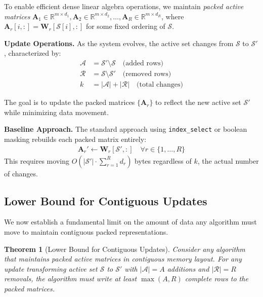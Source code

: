 \documentclass{article}
\numberwithin{equation}{section}
\theoremstyle{plain}
\newtheorem{theorem}{Theorem}[section]
\theoremstyle{definition}
\theoremstyle{remark}
\begin{document}
To enable efficient dense linear algebra operations, we maintain \emph{packed active matrices} $\mathbf{A}_1 \in \mathbb{R}^{m \times d_1}, \mathbf{A}_2 \in \mathbb{R}^{m \times d_2}, \ldots, \mathbf{A}_R \in \mathbb{R}^{m \times d_R}$, where $\mathbf{A}_r[i, :] = \mathbf{W}_r[\mathcal{S}[i], :]$ for some fixed ordering of $\mathcal{S}$.

\textbf{Update Operations.} As the system evolves, the active set changes from $\mathcal{S}$ to $\mathcal{S}'$, characterized by:
\begin{align}
\mathcal{A} &= \mathcal{S}' \setminus \mathcal{S} \quad \text{(added rows)} \\
\mathcal{R} &= \mathcal{S} \setminus \mathcal{S}' \quad \text{(removed rows)} \\
k &= |\mathcal{A}| + |\mathcal{R}| \quad \text{(total changes)}
\end{align}

The goal is to update the packed matrices $\{\mathbf{A}_r\}$ to reflect the new active set $\mathcal{S}'$ while minimizing data movement.

\textbf{Baseline Approach.} The standard approach using \texttt{index\_select} or boolean masking rebuilds each packed matrix entirely:
\begin{align}
\mathbf{A}_r' \leftarrow \mathbf{W}_r[\mathcal{S}', :] \quad \forall r \in \{1, \ldots, R\}
\end{align}
This requires moving $O(|\mathcal{S}'| \cdot \sum_{r=1}^R d_r)$ bytes regardless of $k$, the actual number of changes.

\subsection{Lower Bound for Contiguous Updates}

We now establish a fundamental limit on the amount of data any algorithm must move to maintain contiguous packed representations.

\begin{theorem}[Lower Bound for Contiguous Updates]
\label{thm:lower_bound}
Consider any algorithm that maintains packed active matrices in contiguous memory layout. For any update transforming active set $\mathcal{S}$ to $\mathcal{S}'$ with $|\mathcal{A}| = A$ additions and $|\mathcal{R}| = R$ removals, the algorithm must write at least $\max(A, R)$ complete rows to the packed matrices.
\end{theorem}
\end{document}
